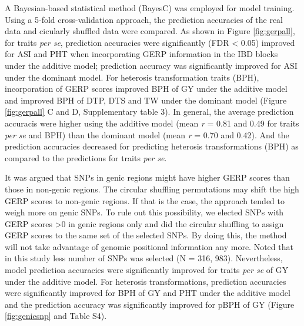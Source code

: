 \documentclass[9pt,twocolumn,twoside]{gsajnl}
\begin{document}
A Bayesian-based statistical method (BayesC) \citep{habier2011extension} was employed for model training. Using a 5-fold cross-validation approach, the prediction accuracies of the real data and cicularly shuffled data were compared. As shown in Figure \ref{fig:gerpall}, for traits \emph{per se}, prediction accuracies were significantly (FDR < 0.05) improved for ASI and PHT when incorporating GERP information in the IBD blocks under the additive model; prediction accuracy was significantly improved for ASI under the dominant model. For heterosis transformation traits (BPH), incorporation of GERP scores improved BPH of GY under the additive model and improved BPH of DTP, DTS and TW under the dominant model (Figure \ref{fig:gerpall} C and D, Supplementary table 3). In general, the average prediction accuracis were higher using the additive model (mean \emph{r} = 0.81 and 0.49 for traits \emph{per se} and BPH) than the dominant model (mean \emph{r} = 0.70 and 0.42). And the prediction accuracies decreased for predicting heterosis transformations (BPH) as compared to the predictions for traits \emph{per se}.

It was argued that SNPs in genic regions might have higher GERP scores than those in non-genic regions. The circular shuffling permutations may shift the high GERP scores to non-genic regions. If that is the case, the approach tended to weigh more on genic SNPs. To rule out this possibility, we elected SNPs with GERP scores >0 in genic regions only and did the circular shuffling to assign GERP scores to the same set of the selected SNPs. By doing this, the method will not take advantage of genomic positional information any more. Noted that in this study less number of SNPs was selected (N = 316, 983). Nevertheless, model prediction accuracies were significantly improved for traits \emph{per se} of GY under the additive model. For heterosis transformations, prediction accuracies were significantly improved for BPH of GY and PHT under the additive model and the prediction accuracy was significantly improved for pBPH of GY (Figure \ref{fig:genicsnp} and Table S4).   
\end{document}
